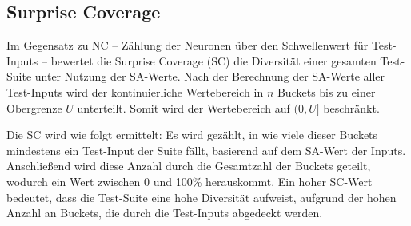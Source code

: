 \documentclass[sigconf, natbib=false]{acmart}
\begin{document}
\subsection{Surprise Coverage}

Im Gegensatz zu NC -- Zählung der Neuronen über den Schwellenwert für Test-Inputs -- bewertet die Surprise Coverage (SC) die Diversität einer gesamten Test-Suite unter Nutzung der SA-Werte. Nach der Berechnung der SA-Werte aller Test-Inputs wird der kontinuierliche Wertebereich in $n$ Buckets bis zu einer Obergrenze $U$ unterteilt. Somit wird der Wertebereich auf $(0,U]$ beschränkt. 

Die SC wird wie folgt ermittelt: Es wird gezählt, in wie viele dieser Buckets mindestens ein Test-Input der Suite fällt, basierend auf dem SA-Wert der Inputs. Anschließend wird diese Anzahl durch die Gesamtzahl der Buckets geteilt, wodurch ein Wert zwischen 0 und 100\% herauskommt. Ein hoher SC-Wert bedeutet, dass die Test-Suite eine hohe Diversität aufweist, aufgrund der hohen Anzahl an Buckets, die durch die Test-Inputs abgedeckt werden.
\end{document}
